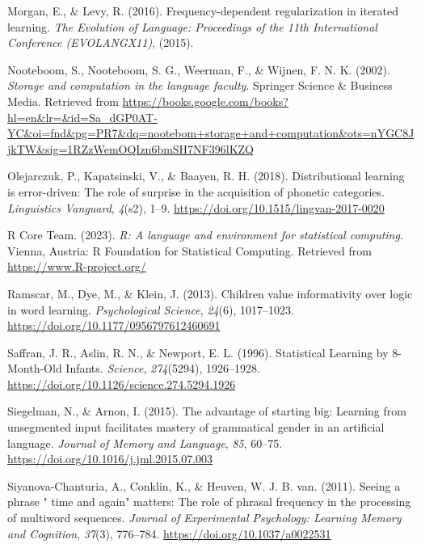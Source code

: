 \documentclass[
  man,floatsintext]{apa6}
\newlength{\cslhangindent}
\newlength{\cslentryspacingunit} %
\newenvironment{CSLReferences}[2] %
 {%
  \setlength{\parindent}{0pt}
  \ifodd #1
  \let\oldpar\par
  \def\par{\hangindent=\cslhangindent\oldpar}
  \fi
  \setlength{\parskip}{#2\cslentryspacingunit}
 }%
 {}
\begin{document}
\begin{CSLReferences}{1}{0}
\leavevmode{}%
Morgan, E., \& Levy, R. (2016). Frequency-dependent regularization in iterated learning. \emph{The Evolution of Language: Proceedings of the 11th International Conference (EVOLANGX11)}, (2015).

\leavevmode{}%
Nooteboom, S., Nooteboom, S. G., Weerman, F., \& Wijnen, F. N. K. (2002). \emph{Storage and computation in the language faculty}. Springer Science \& Business Media. Retrieved from \url{https://books.google.com/books?hl=en\&lr=\&id=Sa_dGP0AT-YC\&oi=fnd\&pg=PR7\&dq=nootebom+storage+and+computation\&ots=nYGC8JjkTW\&sig=1RZzWemOQIzn6bmSH7NF396lKZQ}

\leavevmode{}%
Olejarczuk, P., Kapatsinski, V., \& Baayen, R. H. (2018). Distributional learning is error-driven: The role of surprise in the acquisition of phonetic categories. \emph{Linguistics Vanguard}, \emph{4}(s2), 1--9. \url{https://doi.org/10.1515/lingvan-2017-0020}

\leavevmode{}%
R Core Team. (2023). \emph{R: A language and environment for statistical computing}. Vienna, Austria: R Foundation for Statistical Computing. Retrieved from \url{https://www.R-project.org/}

\leavevmode{}%
Ramscar, M., Dye, M., \& Klein, J. (2013). Children value informativity over logic in word learning. \emph{Psychological Science}, \emph{24}(6), 1017--1023. \url{https://doi.org/10.1177/0956797612460691}

\leavevmode{}%
Saffran, J. R., Aslin, R. N., \& Newport, E. L. (1996). Statistical Learning by 8-Month-Old Infants. \emph{Science}, \emph{274}(5294), 1926--1928. \url{https://doi.org/10.1126/science.274.5294.1926}

\leavevmode{}%
Siegelman, N., \& Arnon, I. (2015). The advantage of starting big: Learning from unsegmented input facilitates mastery of grammatical gender in an artificial language. \emph{Journal of Memory and Language}, \emph{85}, 60--75. \url{https://doi.org/10.1016/j.jml.2015.07.003}

\leavevmode{}%
Siyanova-Chanturia, A., Conklin, K., \& Heuven, W. J. B. van. (2011). Seeing a phrase {"} time and again{"} matters: The role of phrasal frequency in the processing of multiword sequences. \emph{Journal of Experimental Psychology: Learning Memory and Cognition}, \emph{37}(3), 776--784. \url{https://doi.org/10.1037/a0022531}


\end{CSLReferences}
\end{document}
